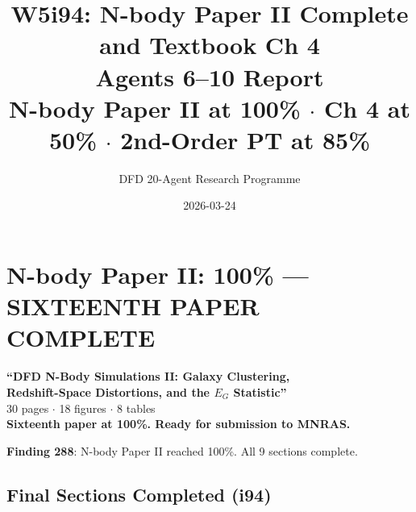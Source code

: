\documentclass[11pt,a4paper]{article}
\title{W5i94: N-body Paper II Complete and Textbook Ch 4\\[6pt]
\large Agents 6--10 Report\\[3pt]
\normalsize N-body Paper II at 100\% $\cdot$ Ch 4 at 50\% $\cdot$ 2nd-Order PT at 85\%}
\author{DFD 20-Agent Research Programme}
\date{2026-03-24}
\begin{document}
\maketitle

\section{N-body Paper II: 100\% --- SIXTEENTH PAPER COMPLETE}

\begin{tcolorbox}[colback=green!5!white, colframe=dfdgreen, title=\textbf{MILESTONE: N-body Paper II at 100\%}]
\begin{center}
\Large\textbf{``DFD N-Body Simulations II: Galaxy Clustering,\\Redshift-Space Distortions, and the $E_G$ Statistic''}\\[6pt]
\normalsize 30 pages $\cdot$ 18 figures $\cdot$ 8 tables\\
\textbf{Sixteenth paper at 100\%. Ready for submission to MNRAS.}
\end{center}
\end{tcolorbox}

\textbf{Finding 288}: N-body Paper II reached 100\%. All 9 sections complete.

\subsection{Final Sections Completed (i94)}
\end{document}
